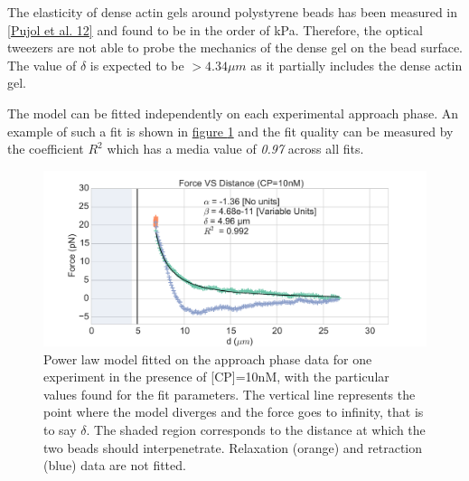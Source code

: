 \documentclass[A4paperpaper,11pt,english]{sphinxmanual}
\begin{document}
The elasticity of dense actin gels around polystyrene beads has been measured
in {\hyperref[parts/part3:pujol2012]{{[}Pujol et al. 12{]}}} and found to be in the order of kPa.  Therefore, the
optical tweezers are not able to probe the mechanics of the dense gel on the
bead surface. The value of \(\delta\)  is expected to be \(> 4.34 \mu{}m\) as it partially includes the dense actin gel.

The model can be fitted independently on each experimental
approach phase. An example of such a fit is shown in
\hyperref[parts/part3:force-distance-fit]{figure  \ref*{parts/part3:force-distance-fit}} and the fit quality can be measured by the
coefficient \(R^2\) which has a media value of \emph{0.97}
across all fits.
\begin{figure}[htbp]
\centering
\capstart

\includegraphics[width=1.000\linewidth]{force-distance-fit.pdf}
\caption{Power law model fitted on the approach phase data for one experiment in the
presence of {[}CP{]}=10nM, with the particular values found for the fit
parameters.  The vertical line represents the point where the model
diverges and the force goes to infinity, that is to say \(\delta\). The
shaded region corresponds to the distance at which the two beads should
interpenetrate. Relaxation (orange) and retraction (blue) data are not fitted.}\label{parts/part3:force-distance-fit}\end{figure}
\end{document}
